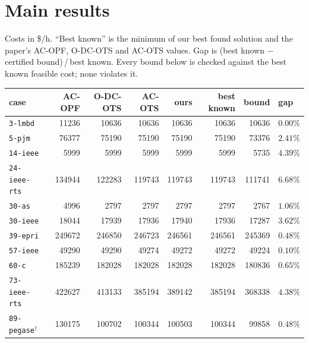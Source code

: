 \documentclass[11pt]{article}
\newcommand{\code}[1]{\texttt{\small #1}}
\begin{document}
\section{Main results}

Costs in \$/h. ``Best known'' is the minimum of our best found solution and the paper's AC-OPF, O-DC-OTS
and AC-OTS values. Gap is (best known $-$ certified bound)\,/\,best known. Every bound below is checked
against the best known feasible cost; none violates it.

\begin{longtable}{lrrrrrrl}
\toprule
case & AC-OPF & O-DC-OTS & AC-OTS & ours & best known & bound & gap \\
\midrule
\endhead
\code{3-lmbd}        & \num{11236}   & \num{10636}   & \num{10636}   & \num{10636}   & \num{10636}   & \num{10636}   & $0.00\%$ \\
\code{5-pjm}         & \num{76377}   & \num{75190}   & \num{75190}   & \num{75190}   & \num{75190}   & \num{73376}   & $2.41\%$ \\
\code{14-ieee}       & \num{5999}    & \num{5999}    & \num{5999}    & \num{5999}    & \num{5999}    & \num{5735}    & $4.39\%$ \\
\code{24-ieee-rts}   & \num{134944}  & \num{122283}  & \num{119743}  & \num{119743}  & \num{119743}  & \num{111741}  & $6.68\%$ \\
\code{30-as}         & \num{4996}    & \num{2797}    & \num{2797}    & \num{2797}    & \num{2797}    & \num{2767}    & $1.06\%$ \\
\code{30-ieee}       & \num{18044}   & \num{17939}   & \num{17936}   & \num{17940}   & \num{17936}   & \num{17287}   & $3.62\%$ \\
\code{39-epri}       & \num{249672}  & \num{246850}  & \num{246723}  & \num{246561}  & \num{246561}  & \num{245369}  & $0.48\%$ \\
\code{57-ieee}       & \num{49290}   & \num{49290}   & \num{49274}   & \num{49272}   & \num{49272}   & \num{49224}   & $0.10\%$ \\
\code{60-c}          & \num{185239}  & \num{182028}  & \num{182028}  & \num{182028}  & \num{182028}  & \num{180836}  & $0.65\%$ \\
\code{73-ieee-rts}   & \num{422627}  & \num{413133}  & \num{385194}  & \num{389142}  & \num{385194}  & \num{368338}  & $4.38\%$ \\
\code{89-pegase}$^\dagger$  & \num{130175} & \num{100702} & \num{100344} & \num{100503} & \num{100344} & \num{99858} & $0.48\%$ \\

\end{longtable}
\end{document}
